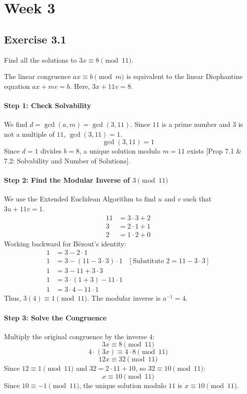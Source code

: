 \section*{Week 3}

\subsection*{Exercise 3.1}
Find all the solutions to $3x \equiv 8 \pmod{11}$.

\begin{solution}
The linear congruence $ax \equiv b \pmod{m}$ is equivalent to the linear Diophantine equation $ax + mv = b$. Here, $3x + 11v = 8$.

\paragraph{Step 1: Check Solvability}
We find $d = \gcd(a, m) = \gcd(3, 11)$.
Since $11$ is a prime number and $3$ is not a multiple of $11$, $\gcd(3, 11) = 1$.
$$ \gcd(3, 11) = 1 $$
Since $d=1$ divides $b=8$, a unique solution modulo $m=11$ exists [Prop 7.1 \& 7.2: Solvability and Number of Solutions].

\paragraph{Step 2: Find the Modular Inverse of $3 \pmod{11}$}
We use the Extended Euclidean Algorithm to find $u$ and $v$ such that $3u + 11v = 1$.
\begin{align*}
    11 &= 3 \cdot 3 + 2 \\
    3 &= 2 \cdot 1 + 1 \\
    2 &= 1 \cdot 2 + 0
\end{align*}
Working backward for Bézout's identity:
\begin{align*}
    1 &= 3 - 2 \cdot 1 \\
    1 &= 3 - (11 - 3 \cdot 3) \cdot 1 & [\text{Substitute } 2 = 11 - 3 \cdot 3] \\
    1 &= 3 - 11 + 3 \cdot 3 \\
    1 &= 3 \cdot (1 + 3) - 11 \cdot 1 \\
    1 &= 3 \cdot 4 - 11 \cdot 1
\end{align*}
Thus, $3(4) \equiv 1 \pmod{11}$. The modular inverse is $a^{-1} = 4$.

\paragraph{Step 3: Solve the Congruence}
Multiply the original congruence by the inverse $4$:
$$ 3x \equiv 8 \pmod{11} $$
$$ 4 \cdot (3x) \equiv 4 \cdot 8 \pmod{11} $$
$$ 12x \equiv 32 \pmod{11} $$
Since $12 \equiv 1 \pmod{11}$ and $32 = 2 \cdot 11 + 10$, so $32 \equiv 10 \pmod{11}$:
$$ x \equiv 10 \pmod{11} $$
Since $10 \equiv -1 \pmod{11}$, the unique solution modulo $11$ is $x \equiv 10 \pmod{11}$.


\end{solution}
